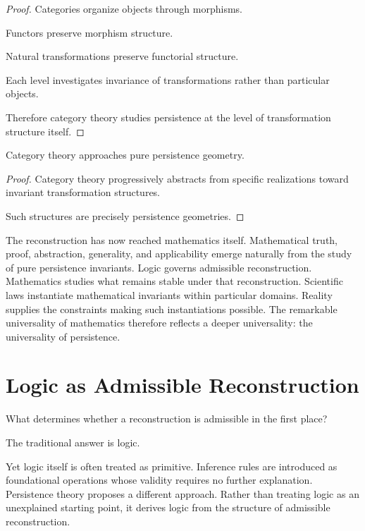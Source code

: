 \documentclass[12pt,oneside]{article}
\theoremstyle{definition}
\begin{document}
\begin{proof}

Categories organize objects through morphisms.

Functors preserve morphism structure.

Natural transformations preserve functorial structure.

Each level investigates invariance of transformations rather than particular objects.

Therefore category theory studies persistence at the level of transformation structure itself.

\end{proof}

\begin{corollary}

Category theory approaches pure persistence geometry.

\end{corollary}

\begin{proof}

Category theory progressively abstracts from specific realizations toward invariant transformation structures.

Such structures are precisely persistence geometries.

\end{proof}

The reconstruction has now reached mathematics itself. Mathematical truth, proof, abstraction, generality, and applicability emerge naturally from the study of pure persistence invariants. Logic governs admissible reconstruction. Mathematics studies what remains stable under that reconstruction. Scientific laws instantiate mathematical invariants within particular domains. Reality supplies the constraints making such instantiations possible. The remarkable universality of mathematics therefore reflects a deeper universality: the universality of persistence.

\section{Logic as Admissible Reconstruction}

What determines whether a reconstruction is admissible in the first place?

The traditional answer is logic.

Yet logic itself is often treated as primitive. Inference rules are introduced as foundational operations whose validity requires no further explanation. Persistence theory proposes a different approach. Rather than treating logic as an unexplained starting point, it derives logic from the structure of admissible reconstruction.
\end{document}
